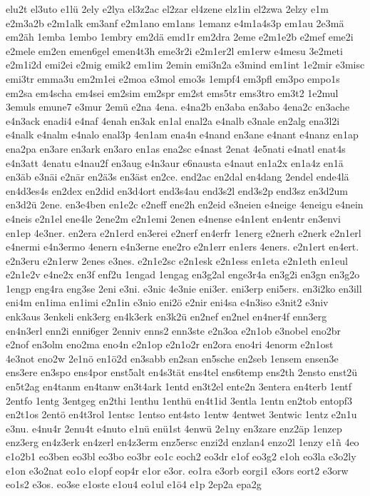 {elu2t
el3uto
e1lü
2ely
e2lya
el3z2ac
el2zar
el4zene
elz1in
el2zwa
2elzy
e1m
e2m3a2b
e2m1alk
em3anf
e2m1ano
em1ans
1emanz
e4m1a4s3p
em1au
2e3mä
em2äh
1emba
1embo
1embry
em2dä
emd1r
em2dra
2eme
e2m1e2b
e2mef
eme2i
e2mele
em2en
emen6gel
emen4t3h
eme3r2i
e2m1er2l
em1erw
e4mesu
3e2meti
e2m1i2d
emi2ei
e2mig
emik2
em1im
2emin
emi3n2a
e3mind
em1int
1e2mir
e3misc
emi3tr
emma3u
em2m1ei
e2moa
e3mol
emo3s
1empf4
em3pfl
em3po
empo1s
em2sa
em4scha
em4sei
em2sim
em2spr
em2st
ems5tr
ems3tro
em3t2
1e2mul
3emuls
emune7
e3mur
2emü
e2na
4ena.
e4na2b
en3aba
en3abo
4ena2c
en3ache
e4n3ack
enadi4
e4naf
4enah
en3ak
en1al
enal2a
e4nalb
e3nale
en2alg
ena3l2i
e4nalk
e4nalm
e4nalo
enal3p
4en1am
ena4n
e4nand
en3ane
e4nant
e4nanz
en1ap
ena2pa
en3are
en3ark
en3aro
en1as
ena2sc
e4nast
2enat
4e5nati
e4natl
enat4s
e4n3att
4enatu
e4nau2f
en3aug
e4n3aur
e6nausta
e4naut
en1a2x
en1a4z
en1ä
en3äb
e3näi
e2när
en2ä3s
en3äst
en2ce.
end2ac
en2dal
en4dang
2endel
ende4lä
en4d3es4s
en2dex
en2did
en3d4ort
end3s4au
end3s2l
end3s2p
end3sz
en3d2um
en3d2ü
2ene.
en3e4ben
en1e2c
e2neff
ene2h
en2eid
e3neien
e4neige
4eneigu
e4nein
e4neis
e2n1el
ene4le
2ene2m
e2n1emi
2enen
e4nense
e4n1ent
en4entr
en3envi
en1ep
4e3ner.
en2era
e2n1erd
en3erei
e2nerf
en4erfr
1energ
e2nerh
e2nerk
e2n1erl
e4nermi
e4n3ermo
4enern
e4n3erne
ene2ro
e2n1err
en1ers
4eners.
e2n1ert
en4ert.
e2n3eru
e2n1erw
2enes
e3nes.
e2n1e2sc
e2n1esk
e2n1ess
en1eta
e2n1eth
en1eul
e2n1e2v
e4ne2x
en3f
enf2u
1engad
1engag
en3g2al
enge3r4a
en3g2i
en3gn
en3g2o
1engp
eng4ra
eng3se
2eni
e3ni.
e3nic
4e3nie
eni3er.
eni3erp
eni5ers.
en3i2ko
en3ill
eni4m
en1ima
en1imi
e2n1in
e3nio
eni2ö
e2nir
eni4sa
e4n3iso
e3nit2
e3niv
enk3aus
3enkeli
enk3erg
en4k3erk
en3k2ü
en2nef
en2nel
en4ner4f
enn3erg
en4n3erl
enn2i
enni6ger
2enniv
enns2
enn3ste
e2n3oa
e2n1ob
e3nobel
eno2br
e2nof
en3olm
eno2ma
eno4n
e2n1op
e2n1o2r
en2ora
eno4ri
4enorm
e2n1ost
4e3not
eno2w
2e1nö
en1ö2d
en3sabb
en2san
en5sche
en2seb
1ensem
ensen3e
ens3ere
en3spo
ens4por
enst5alt
en4s3tät
ens4tel
ens6temp
ens2th
2ensto
enst2ü
en5t2ag
en4tanm
en4tanw
en3t4ark
1entd
en3t2el
ente2n
3entera
en4terb
1entf
2entfo
1entg
3entgeg
en2thi
1enthu
1enthü
en4t1id
3entla
1entn
en2tob
entopf3
en2t1os
2entö
en4t3rol
1entsc
1entso
ent4sto
1entw
4entwet
3entwic
1entz
e2n1u
e3nu.
e4nu4r
2enu4t
e4nuto
e1nü
enü1st
4enwü
2e1ny
en3zare
enz2äp
1enzep
enz3erg
en4z3erk
en4zerl
en4z3erm
enz5ersc
enzi2d
enzlan4
enzo2l
1enzy
e1ñ
4eo
e1o2b1
eo3ben
eo3bl
eo3bo
eo3br
eo1c
eoch2
eo3dr
e1of
eo3g2
e1oh
eo3la
e3o2ly
e1on
e3o2nat
eo1o
e1opf
eop4r
e1or
e3or.
eo1ra
e3orb
eorgi1
e3ors
eort2
e3orw
eo1s2
e3os.
eo3se
e1oste
e1ou4
eo1ul
e1ö4
e1p
2ep2a
epa2g
}
